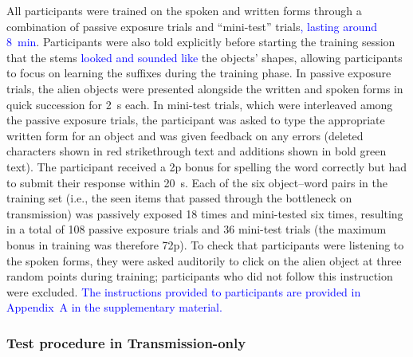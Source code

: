 \documentclass[doc,biblatex]{apa7}
\newcommand\newmaterial[1]{\textcolor{blue}{#1}}
\begin{document}
All participants were trained on the spoken and written forms through a combination of passive exposure trials and ``mini-test'' trials\newmaterial{, lasting around 8~min}. Participants were also told explicitly before starting the training session that the stems \newmaterial{looked and sounded like} the objects' shapes, allowing participants to focus on learning the suffixes during the training phase. In passive exposure trials, the alien objects were presented alongside the written and spoken forms in quick succession for 2~s each. In mini-test trials, which were interleaved among the passive exposure trials, the participant was asked to type the appropriate written form for an object and was given feedback on any errors (deleted characters shown in red strikethrough text and additions shown in bold green text). The participant received a 2p bonus for spelling the word correctly but had to submit their response within 20~s. Each of the six object--word pairs in the training set (i.e., the seen items that passed through the bottleneck on transmission) was passively exposed 18 times and mini-tested six times, resulting in a total of 108 passive exposure trials and 36 mini-test trials (the maximum bonus in training was therefore 72p). To check that participants were listening to the spoken forms, they were asked auditorily to click on the alien object at three random points during training; participants who did not follow this instruction were excluded. \newmaterial{The instructions provided to participants are provided in Appendix~A in the supplementary material.}

\subsubsection{Test procedure in Transmission-only}
\end{document}

